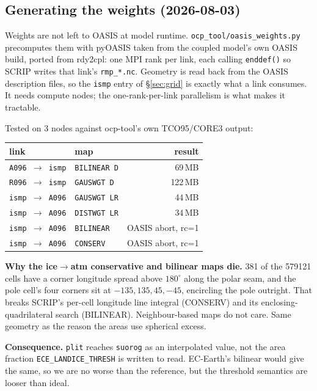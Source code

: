 \documentclass[11pt,a4paper]{article}
\newcommand{\code}[1]{\texttt{\small #1}}
\begin{document}
\subsection{Generating the weights (2026-08-03)}
\label{sec:weights}

Weights are not left to OASIS at model runtime. \code{ocp\_tool/oasis\_weights.py} precomputes
them with pyOASIS taken from the coupled model's own OASIS build, ported from rdy2cpl: one MPI
rank per link, each calling \code{enddef()} so SCRIP writes that link's \code{rmp\_*.nc}. Geometry
is read back from the OASIS description files, so the \code{ismp} entry of \S\ref{sec:grid} is
exactly what a link consumes. It needs compute nodes; the one-rank-per-link parallelism is what
makes it tractable.

Tested on 3 nodes against ocp-tool's own TCO95/CORE3 output:

\begin{center}
\begin{tabular}{@{}llr@{}}
\toprule
link & map & result \\
\midrule
\code{A096 $\to$ ismp} & \code{BILINEAR D}  & 69\,MB \\
\code{R096 $\to$ ismp} & \code{GAUSWGT D}   & 122\,MB \\
\code{ismp $\to$ A096} & \code{GAUSWGT LR}  & 44\,MB \\
\code{ismp $\to$ A096} & \code{DISTWGT LR}  & 34\,MB \\
\code{ismp $\to$ A096} & \code{BILINEAR}    & OASIS abort, rc=1 \\
\code{ismp $\to$ A096} & \code{CONSERV}     & OASIS abort, rc=1 \\
\bottomrule
\end{tabular}
\end{center}

\noindent
\textbf{Why the ice$\to$atm conservative and bilinear maps die.} 381 of the 579121 cells have a
corner longitude spread above $180^\circ$ along the polar seam, and the pole cell's four corners
sit at $-135, 135, 45, -45$, encircling the pole outright. That breaks SCRIP's per-cell longitude
line integral (CONSERV) and its enclosing-quadrilateral search (BILINEAR). Neighbour-based maps do
not care. Same geometry as the reason the areas use spherical excess.

\medskip\noindent
\textbf{Consequence.} \code{plit} reaches \code{suorog} as an interpolated value, not the area
fraction \code{ECE\_LANDICE\_THRESH} is written to read. EC-Earth's bilinear would give the same,
so we are no worse than the reference, but the threshold semantics are looser than ideal.
\end{document}
